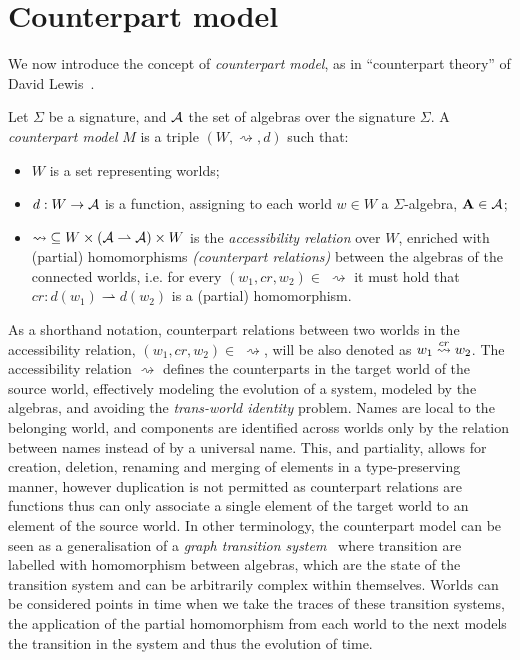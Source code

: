 \section{Counterpart model}

We now introduce the concept of \emph{counterpart model}, as in ``counterpart theory'' of David
Lewis~\cite{lewis_counterpart_1968,lewis_plurality_2001}.

\begin{definition}
Let $\Sigma$ be a signature, and $\mathcal{A}$ the set of algebras over the signature $\Sigma$. A \emph{counterpart
model} $M$ is a triple $(W, \rightsquigarrow, d)$ such that:
\begin{itemize}
  \item $W$ is a set representing worlds;
  \item $d : W \to \mathcal{A}$ is a function, assigning to each world $w \in W$ a $\Sigma$-algebra, $\mathbf{A} \in
    \mathcal{A}$;
  \item $\rightsquigarrow\;\subseteq W \times (\mathcal{A} \rightharpoonup \mathcal{A}) \times W$ is the
    \emph{accessibility relation} over $W$, enriched with (partial) homomorphisms \emph{(counterpart relations)} between
  the algebras of the connected worlds, i.e. for every $(w_1, cr, w_2) \in\;\rightsquigarrow$ it must hold that $cr :
  d(w_1) \rightharpoonup d(w_2)$ is a (partial) homomorphism.
\end{itemize}
\end{definition}

As a shorthand notation, counterpart relations between two worlds in the accessibility relation, $(w_1, cr, w_2) \in
\;\rightsquigarrow$, will be also denoted as $w_1 \overset{cr}{\rightsquigarrow} w_2$.  The accessibility relation $\rightsquigarrow$
defines the counterparts in the target world of the source world, effectively modeling the evolution of a system,
modeled by the algebras, and avoiding the \emph{trans-world identity} problem. Names are local to the belonging world,
and components are identified across worlds only by the relation between names instead of by a universal name. This, and
partiality, allows for creation, deletion, renaming and merging of elements in a type-preserving manner, however
duplication is not permitted as counterpart relations are functions thus can only associate a single element of the
target world to an element of the source world.  In other terminology, the counterpart model can be seen as a
generalisation of a \emph{graph transition system}~\cite{fiadeiro_temporal_2007} where transition are labelled with
homomorphism between algebras, which are the state of the transition system and can be arbitrarily complex within
themselves. Worlds can be considered points in time when we take the traces of these transition systems, the application
of the partial homomorphism from each world to the next models the transition in the system and thus the evolution of
time.


